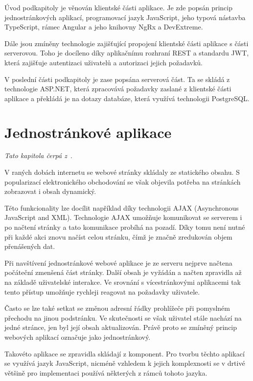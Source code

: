 Úvod podkapitoly je věnován klientské části aplikace. Je zde popsán princip jednostránkových aplikací, programovací jazyk JavaScript, jeho typová nástavba TypeScript, rámec Angular a jeho knihovny NgRx a DevExtreme.

Dále jsou zmíněny technologie zajišťující propojení klientské části aplikace s části serverovou. Toho je docíleno díky aplikačnímu rozhraní REST a standardu JWT, která zajišťuje autentizaci uživatelů a autorizaci jejich požadavků.

V poslední části podkapitoly je zase popsána serverová část. Ta se skládá z technologie ASP.NET, která zpracovává požadavky zaslané z klientské části aplikace a překládá je na dotazy databáze, která využívá technologii PostgreSQL.


\section{Jednostránkové aplikace}\label{sec:spa}

\emph{Tato kapitola čerpá z~\cite{bib:spa}}.

V raných dobách internetu se webové stránky skládaly ze statického obsahu. S popularizací elektronického obchodování se však objevila potřeba na stránkách zobrazovat i obsah dynamický. 

Této funkcionality lze docílit například díky technologii AJAX (Asynchronous JavaScript and XML). Technologie AJAX umožňuje komunikovat se serverem i po načtení stránky a tato komunikace probíhá na pozadí. Díky tomu není nutné při každé akci znovu načíst celou stránku, čímž je značně zredukován objem přenášených dat.

Při navštívení jednostránkové webové aplikace je ze serveru nejprve načtena počáteční zmenšená část stránky. Další obsah je vyžádán a načten zpravidla až na základě uživatelské interakce. Ve srovnání s vícestránkovými aplikacemi tak tento přístup umožňuje rychleji reagovat na požadavky uživatele.

Často se lze také setkat se změnou adresní řádky prohlížeče při pomyslném přechodu na jinou podstránku. Ve skutečnosti se však uživatel stále nachází na jedné stránce, jen byl její obsah aktualizován. Právě proto se zmíněný princip webových aplikací označuje jako jednostránkový.

Takovéto aplikace se zpravidla skládají z komponent. Pro tvorbu těchto aplikací se využívá jazyk JavaScript, nicméně vzhledem k jejich komplexnosti se v drtivé většině pro implementaci používá některých z rámců tohoto jazyka.

